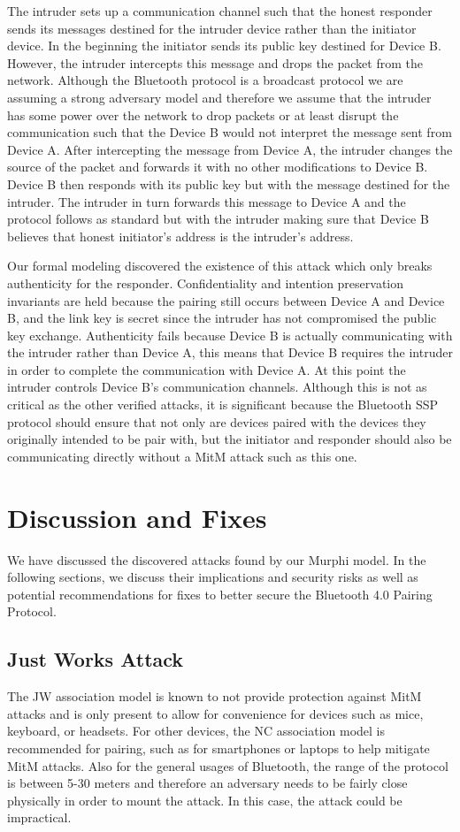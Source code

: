 \documentclass{acm_proc_article-sp}
\begin{document}
The intruder sets up a communication channel such that the honest responder sends its messages destined for the intruder device rather than the initiator device. In the beginning the initiator sends its public key destined for Device B. However, the intruder intercepts this message and drops the packet from the network. Although the Bluetooth protocol is a broadcast protocol we are assuming a strong adversary model and therefore we assume that the intruder has some power over the network to drop packets or at least disrupt the communication such that the Device B would not interpret the message sent from Device A. After intercepting the message from Device A, the intruder changes the source of the packet and forwards it with no other modifications to Device B. Device B then responds with its public key but with the message destined for the intruder. The intruder in turn forwards this message to Device A and the protocol follows as standard but with the intruder making sure that Device B believes that honest initiator's address is the intruder's address.

Our formal modeling discovered the existence of this attack which only breaks authenticity for the responder. Confidentiality and intention preservation invariants are held because the pairing still occurs between Device A and Device B, and the link key is secret since the intruder has not compromised the public key exchange. Authenticity fails because Device B is actually communicating with the intruder rather than Device A, this means that Device B requires the intruder in order to complete the communication with Device A. At this point the intruder controls Device B's communication channels. Although this is not as critical as the other verified attacks, it is significant because the Bluetooth SSP protocol should ensure that not only are devices paired with the devices they originally intended to be pair with, but the initiator and responder should also be communicating directly without a MitM attack such as this one.

\section{Discussion and Fixes}
We have discussed the discovered attacks found by our Murphi model. In the following sections, we discuss their implications and security risks as well as potential recommendations for fixes to better secure the Bluetooth 4.0 Pairing Protocol.

\subsection{Just Works Attack}
The JW association model is known to not provide protection against MitM attacks and is only present to allow for convenience for devices such as mice, keyboard, or headsets. For other devices, the NC association model is recommended for pairing, such as for smartphones or laptops to help mitigate MitM attacks. Also for the general usages of Bluetooth, the range of the protocol is between 5-30 meters and therefore an adversary needs to be fairly close physically in order to mount the attack. In this case, the attack could be impractical.
\end{document}
